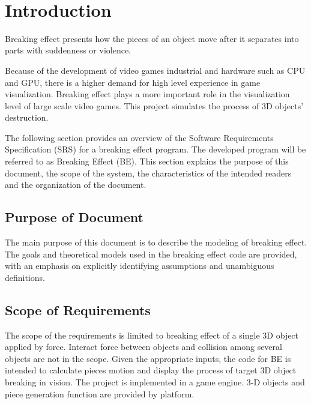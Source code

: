 \documentclass[12pt]{article}
\begin{document}
	~\newpage
	
	
	\section{Introduction}
	
	Breaking effect presents how the pieces of an object move after it separates into parts with suddenness or violence. 
	
	Because of the development of video games industrial and hardware such as CPU
	and GPU, there is a higher demand for high level experience in game
	visualization. Breaking effect plays a more important role in the visualization
	level of large scale video games.   This project simulates the process of 3D objects’ destruction.
	
	The following section provides an overview of the Software Requirements Specification (SRS) for a breaking effect program. The developed program will be referred to as Breaking Effect (BE). This section explains the purpose of this document, the scope of the system, the characteristics of the intended readers and the organization of the document.
	
	
	\subsection{Purpose of Document}
	
	The main purpose of this document is to describe the modeling of breaking effect. The goals and theoretical models used in the breaking effect code are provided, with an emphasis on explicitly identifying assumptions and unambiguous definitions. 
	
	\subsection{Scope of Requirements} 
	
	The scope of the requirements is limited to breaking effect of a single 3D object applied by force. Interact force between objects and collision among several objects are not in the scope. Given the appropriate inputs, the code for BE is intended to calculate pieces motion and display the process of target 3D object breaking in vision. The project is implemented in a game engine. 3-D objects and piece generation function are provided by platform. 
	
\end{document}
